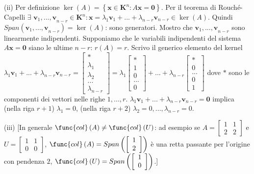 \documentclass{article}
\begin{document}
(ii) Per definizione $\ker \left( A\right) =\left\{ \mathbf{x\in K}^{n}:A%
\mathbf{x=0}\right\} $. Per il teorema di Rouch\'{e}-Capelli $\exists $ $%
\mathbf{v}_{1}\mathbf{,...,v}_{n-r}\in \mathbf{K}^{n}:\mathbf{x}=\lambda _{1}%
\mathbf{v}_{1}+...+\lambda _{n-r}\mathbf{v}_{n-r}\in \ker \left( A\right) $.
Quindi $Span\left( \mathbf{v}_{1}\mathbf{,...,v}_{n-r}\right) =\ker \left(
A\right) $: sono generatori. Mostro che $\mathbf{v}_{1}\mathbf{,...,v}_{n-r}$
sono linearmente indipendenti. Supponiamo che le variabili indipendenti del
sistema $A\mathbf{x=0}$ siano le ultime $n-r$: $r\left( A\right) =r$. Scrivo
il generico elemento del kernel $\lambda _{1}\mathbf{v}_{1}+...+\lambda
_{n-r}\mathbf{v}_{n-r}=\left[ 
\begin{array}{c}
\ast \\ 
\lambda _{1} \\ 
\lambda _{2} \\ 
... \\ 
\lambda _{n-r}%
\end{array}%
\right] =\lambda _{1}\left[ 
\begin{array}{c}
\ast \\ 
1 \\ 
0 \\ 
... \\ 
0%
\end{array}%
\right] +...+\lambda _{n-r}\left[ 
\begin{array}{c}
\ast \\ 
0 \\ 
... \\ 
0 \\ 
1%
\end{array}%
\right] $ dove $\ast $ sono le componenti dei vettori nelle righe $1,...,r$. 
$\lambda _{1}\mathbf{v}_{1}+...+\lambda _{n-r}\mathbf{v}_{n-r}=\mathbf{0}$
implica (nella riga $r+1$) $\lambda _{1}=0$, (nella riga $r+2$) $\lambda
_{2}=0,...,\lambda _{n-r}=0$.

(iii) [In generale $\func{col}\left( A\right) \neq \func{col}\left( U\right) 
$: ad esempio se $A=\left[ 
\begin{array}{cc}
1 & 1 \\ 
2 & 2%
\end{array}%
\right] $ e $U=\left[ 
\begin{array}{cc}
1 & 1 \\ 
0 & 0%
\end{array}%
\right] $, $\func{col}\left( A\right) =Span\left( \left[ 
\begin{array}{c}
1 \\ 
2%
\end{array}%
\right] \right) $ \`{e} una retta passante per l'origine con pendenza $2$, $%
\func{col}\left( U\right) =Span\left( \left[ 
\begin{array}{c}
1 \\ 
0%
\end{array}%
\right] \right) $.]
\end{document}
